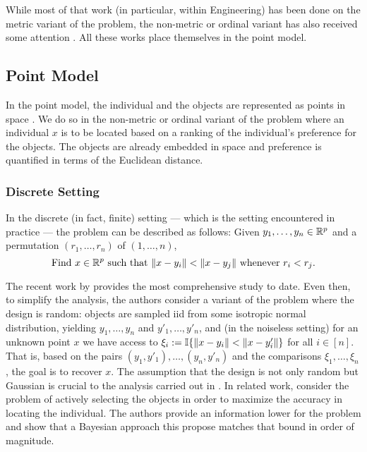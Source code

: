 \documentclass[twoside, 11pt]{article}
\begin{document}
While most of that work (in particular, within Engineering) has been done on the metric variant of the problem, the non-metric or ordinal variant has also received some attention  \cite{srinivasan1973linear, massimino2021you, davenport2013lost, anderton2019scaling}.
All these works place themselves in the point model. 


\subsection{Point Model}
In the point model, the individual and the objects are represented as points in space \cite[Sec 14.1]{borg2005modern}. We do so in the non-metric or ordinal variant of the problem where an individual $x$ is to be located based on a ranking of the individual's preference for the objects. The objects are already embedded in space and preference is quantified in terms of the Euclidean distance.

\subsubsection{Discrete Setting}
\label{sec:external point discrete}
In the discrete (in fact, finite) setting --- which is the setting encountered in practice --- the problem can be described as follows: Given $y_1, \dots, y_n \in \mathbb{R}^p$ and a permutation $(r_1, \dots, r_n)$ of $(1, \dots, n)$,
\begin{equation}
\label{total_order_finite_point}
\text{Find $x \in \mathbb{R}^p$ such that $\|x-y_i\| < \|x-y_j\|$ whenever $r_i < r_j$.}
\end{equation}

The recent work by \citet{massimino2021you} provides the most comprehensive study to date. Even then, to simplify the analysis, the authors consider a variant of the problem where the design is random: objects are sampled iid from some isotropic normal distribution, yielding $y_1, \dots, y_n$ and $y'_1, \dots, y'_n$, and (in the noiseless setting) for an unknown point $x$ we have access to $\xi_i := \mathbb{I}\{ \|x-y_i\| < \|x-y'_i\| \}$ for all $i \in [n]$. That is, based on the pairs $(y_1, y'_1), \dots, (y_n, y'_n)$ and the comparisons $\xi_1, \dots, \xi_n$, the goal is to recover $x$. The assumption that the design is not only random but Gaussian is crucial to the analysis carried out in \cite{massimino2021you}.
In related work, \citet{pmlr-v97-canal19a} consider the problem of actively selecting the objects in order to maximize the accuracy in locating the individual. The authors provide an information lower for the problem and show that a Bayesian approach this propose matches that bound in order of magnitude.
\end{document}
